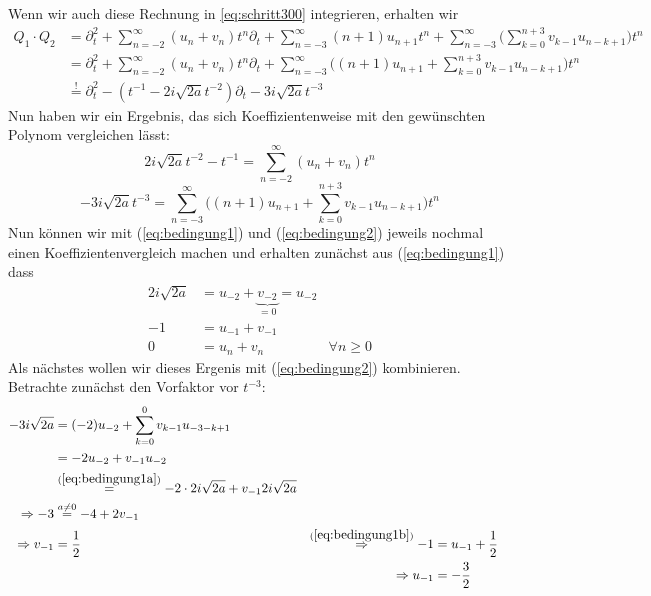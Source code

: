 Wenn wir auch diese Rechnung in \ref{eq:schritt300} integrieren, erhalten wir
\begin{equation} \label{eq:schritt300}
  \begin{aligned}
Q_1\cdot Q_2&=\partial_t^2 + \sum_{n=-2}^\infty (u_n+v_n)t^n \partial_t 
  + \sum_{n=-3}^\infty (n+1)u_{n+1}t^{n} 
  + \sum_{n=-3}^\infty \Big( \sum_{k=0}^{n+3} v_{k-1}u_{n-k+1} \Big) t^{n}
\\&=\partial_t^2 + \sum_{n=-2}^\infty (u_n+v_n)t^n \partial_t 
  + \sum_{n=-3}^\infty 
  \Big( (n+1)u_{n+1} + \sum_{k=0}^{n+3} v_{k-1}u_{n-k+1} \Big) t^{n}
\\&\overset{!}{=} \partial_t^2 - (t^{-1} - 2i\sqrt{2a}t^{-2})\partial_t 
  - 3 i\sqrt{2a}t^{-3}
  \end{aligned}
\end{equation}
Nun haben wir ein Ergebnis, das sich Koeffizientenweise mit den gewünschten
Polynom vergleichen lässt:
\begin{equation} \label{eq:bedingung1}
2i\sqrt{2a}t^{-2} - t^{-1}=\sum_{n=-2}^\infty (u_n+v_n)t^n
\end{equation}
\begin{equation} \label{eq:bedingung2}
- 3 i\sqrt{2a}t^{-3}= \sum_{n=-3}^\infty 
  \Big( (n+1)u_{n+1} + \sum_{k=0}^{n+3} v_{k-1}u_{n-k+1} \Big) t^{n}
\end{equation}
Nun können wir mit (\ref{eq:bedingung1}) und (\ref{eq:bedingung2}) jeweils
nochmal einen Koeffizientenvergleich machen und erhalten zunächst aus
(\ref{eq:bedingung1}) dass
\begin{align}
2i\sqrt{2a} &= u_{-2} + \underset{=0}{\underbrace{v_{-2}}} = u_{-2}
\label{eq:bedingung1a}
\\-1 &= u_{-1} + v_{-1}
\label{eq:bedingung1b}
\\0 &= u_n + v_n & \forall n \geq 0 
\label{eq:bedingung1c}
\end{align}
Als nächstes wollen wir dieses Ergenis mit (\ref{eq:bedingung2}) kombinieren.
Betrachte zunächst den Vorfaktor vor $t^{-3}$:
\begin{align*}
- 3 i\sqrt{2a} &= (-2)u_{-2} + \sum_{k=0}^{0} v_{k-1}u_{-3-k+1}
\\&= -2u_{-2} + v_{-1}u_{-2}
\\&\overset{(\ref{eq:bedingung1a})}{=} -2\cdot2i\sqrt{2a} + v_{-1}2i\sqrt{2a}
\\\Rightarrow -3&\overset{a\neq0}{=}-4+2v_{-1}
\\\Rightarrow v_{-1} &= \frac{1}{2} 
& \overset{(\ref{eq:bedingung1b})}{\Rightarrow} -1&=u_{-1}+\frac{1}{2}
\\ & & \Rightarrow u_{-1}&=-\frac{3}{2}
\end{align*}
